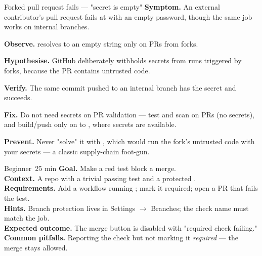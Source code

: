 \begin{debuglab}{Forked pull request fails --- "secret is empty"}
\textbf{Symptom.} An external contributor's pull request fails at  with an empty password, though the same job works on internal branches.

\begin{tickcheck}
  \item \textbf{Observe.}  resolves to an empty string only on PRs from forks.
  \item \textbf{Hypothesise.} GitHub deliberately withholds secrets from  runs triggered by forks, because the PR contains untrusted code.
  \item \textbf{Verify.} The same commit pushed to an internal branch has the secret and succeeds.
  \item \textbf{Fix.} Do not need secrets on PR validation --- test and scan on PRs (no secrets), and build/push only on  to , where secrets are available.
  \item \textbf{Prevent.} Never "solve" it with , which would run the fork's untrusted code with your secrets --- a classic supply-chain foot-gun.
\end{tickcheck}
\end{debuglab}


\begin{minilab}{Beginner}{~25 min}
\textbf{Goal.} Make a red test block a merge.\\
\textbf{Context.} A repo with a trivial passing test and a protected .\\
\textbf{Requirements.} Add a  workflow running ; mark it required; open a PR that fails the test.\\
\textbf{Hints.} Branch protection lives in Settings $\rightarrow$ Branches; the check name must match the job.\\
\textbf{Expected outcome.} The merge button is disabled with "required check failing."\\
\textbf{Common pitfalls.} Reporting the check but not marking it \emph{required} --- the merge stays allowed.
\end{minilab}

